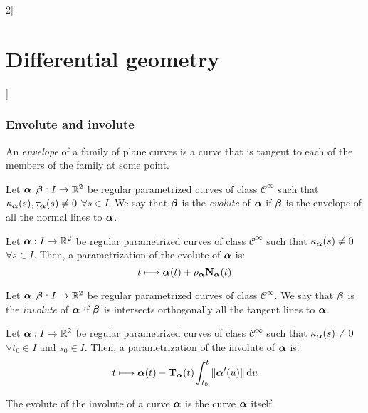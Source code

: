 \documentclass[../../../main.tex]{subfiles}
\begin{document}
\begin{multicols}{2}[\section{Differential geometry}]
  \subsubsection{Envolute and involute}
  \begin{definition}
    An \emph{envelope} of a family of plane curves is a curve that is tangent to each of the members of the family at some point.
  \end{definition}
  \begin{definition}
    Let $\boldsymbol{\mathrm{\alpha}},\boldsymbol{\mathrm{\beta}}:I\rightarrow\mathbb{R}^2$ be regular parametrized curves of class $\mathcal{C}^\infty$ such that ${\kappa_{\boldsymbol{\mathrm{\alpha}}}}(s),{\tau_{\boldsymbol{\mathrm{\alpha}}}}(s)\ne 0$ $\forall s\in I$. We say that $\boldsymbol{\mathrm{\beta}}$ is the \emph{evolute} of $\boldsymbol{\mathrm{\alpha}}$ if $\boldsymbol{\mathrm{\beta}}$ is the envelope of all the normal lines to $\boldsymbol{\mathrm{\alpha}}$.
  \end{definition}
  \begin{proposition}
    Let $\boldsymbol{\mathrm{\alpha}}:I\rightarrow\mathbb{R}^2$ be regular parametrized curves of class $\mathcal{C}^\infty$ such that ${\kappa_{\boldsymbol{\mathrm{\alpha}}}}(s)\ne 0$ $\forall s\in I$. Then, a parametrization of the evolute of $\boldsymbol{\mathrm{\alpha}}$ is: $$t\longmapsto \boldsymbol{\mathrm{\alpha}}(t)+{\rho_{\boldsymbol{\mathrm{\alpha}}}}{\boldsymbol{\mathrm{N}}_{\boldsymbol{\mathrm{\alpha}}}}(t)$$
  \end{proposition}
  \begin{definition}
    Let $\boldsymbol{\mathrm{\alpha}},\boldsymbol{\mathrm{\beta}}:I\rightarrow\mathbb{R}^2$ be regular parametrized curves of class $\mathcal{C}^\infty$. We say that $\boldsymbol{\mathrm{\beta}}$ is the \emph{involute} of $\boldsymbol{\mathrm{\alpha}}$ if $\boldsymbol{\mathrm{\beta}}$ is intersects orthogonally all the tangent lines to $\boldsymbol{\mathrm{\alpha}}$.
  \end{definition}
  \begin{proposition}
    Let $\boldsymbol{\mathrm{\alpha}}:I\rightarrow\mathbb{R}^2$ be regular parametrized curves of class $\mathcal{C}^\infty$ such that ${\kappa_{\boldsymbol{\mathrm{\alpha}}}}(s)\ne 0$ $\forall t_0\in I$ and $s_0\in I$. Then, a parametrization of the involute of $\boldsymbol{\mathrm{\alpha}}$ is: $$t\longmapsto \boldsymbol{\mathrm{\alpha}}(t)-{\boldsymbol{\mathrm{T}}_{\boldsymbol{\mathrm{\alpha}}}}(t) \int_{t_0}^t\|\boldsymbol{\mathrm{\alpha}}'(u)\|\dd{u}$$
  \end{proposition}
  \begin{proposition}
    The evolute of the involute of a curve $\boldsymbol{\mathrm{\alpha}}$ is the curve $\boldsymbol{\mathrm{\alpha}}$ itself.
  \end{proposition}
  \begin{center}
    \begin{minipage}{\linewidth}
      \centering
      
    \end{minipage}
  \end{center}

\end{multicols}
\end{document}
